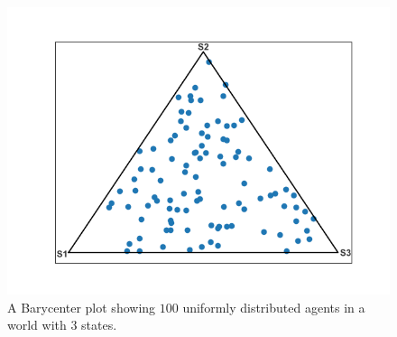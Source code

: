 \begin{figure}[H]
 \centering
  \begin{minipage}[ht]{0.45\textwidth}
    \includegraphics[width=\textwidth]{Images/Figures/OpenModel/open_model_BC_n_3_p_100_gullibility_0,3_runs_10.png}
 \end{minipage}
 \caption{ A Barycenter plot showing $100$ uniformly distributed agents in a world with 3 states.  }\label{fig:eg_bary}
\end{figure}


